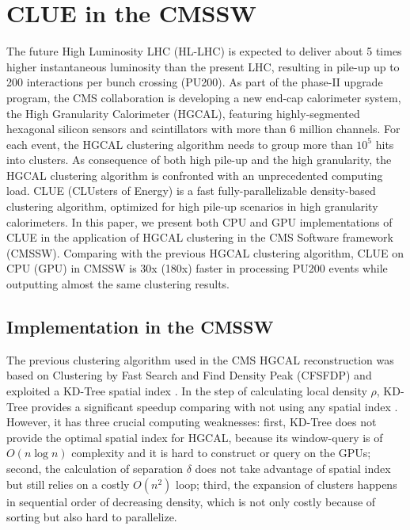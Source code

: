 \section{CLUE in the CMSSW}
\label{sec:cmsswClue}


The future High Luminosity LHC (HL-LHC) is expected to deliver about 5 times higher instantaneous luminosity than the present LHC, resulting in pile-up up to 200 interactions per bunch crossing (PU200). As part of the phase-II upgrade program, the CMS collaboration is developing a new end-cap calorimeter system, the High Granularity Calorimeter (HGCAL), featuring highly-segmented hexagonal silicon sensors and scintillators with more than 6 million channels. For each event, the HGCAL clustering algorithm needs to group more than $10^5$ hits into clusters. As consequence of both high pile-up and the high granularity, the HGCAL clustering algorithm is confronted with an unprecedented computing load. CLUE (CLUsters of Energy) is a fast fully-parallelizable density-based clustering algorithm, optimized for high pile-up scenarios in high granularity calorimeters. In this paper, we present both CPU and GPU implementations of CLUE in the application of HGCAL clustering in the CMS Software framework (CMSSW). Comparing with the previous HGCAL clustering algorithm, CLUE on CPU (GPU) in CMSSW is 30x (180x) faster in processing PU200 events while outputting almost the same clustering results.


\subsection{Implementation in the CMSSW}



The previous clustering algorithm \cite{Chen:2017btc} used in the CMS HGCAL reconstruction was based on Clustering by Fast Search and Find Density Peak (CFSFDP) \cite{rodriguez2014clustering} and exploited a KD-Tree spatial index \cite{Bentley:1975:MBS:361002.361007}. In the step of calculating local density $\rho$, KD-Tree provides a significant speedup comparing with not using any spatial index \cite{Chen:2017btc}. However, it has three crucial computing weaknesses: first, KD-Tree does not provide the optimal spatial index for HGCAL, because its window-query is of $O(n\log n)$ complexity and it is hard to construct or query on the GPUs; second, the calculation of separation $\delta$ does not take advantage of spatial index but still relies on a costly $O(n^2)$ loop; third, the expansion of clusters happens in sequential order of decreasing density, which is not only costly because of sorting but also hard to parallelize.


